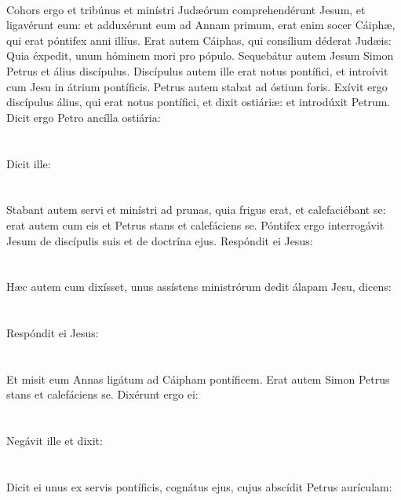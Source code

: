 \documentclass[12pt, a4paper]{article}
\begin{document}
	\\
	Cohors ergo et tribúnus et minístri Judæórum comprehendérunt Jesum, et ligavérunt eum: et adduxérunt eum ad Annam primum, erat enim socer Cáiphæ, qui erat póntifex anni illíus. Erat autem Cáiphas, qui consílium déderat Judæis: Quia éxpedit, unum hóminem mori pro pópulo. Sequebátur autem Jesum Simon Petrus et álius discípulus. Discípulus autem ille erat notus pontífici, et introívit cum Jesu in átrium pontíficis. Petrus autem stabat ad óstium foris. Exívit ergo discípulus álius, qui erat notus pontífici, et dixit ostiáriæ: et introdúxit Petrum. Dicit ergo Petro ancílla ostiária: 
	\\\\
	\\
	Dicit ille:
	\\\\
	\\
	Stabant autem servi et minístri ad prunas, quia frigus erat, et calefaciébant se: erat autem cum eis et Petrus stans et calefáciens se. Póntifex ergo interrogávit Jesum de discípulis suis et de doctrína ejus. Respóndit ei Jesus: 
	\\\\
	\\
	Hæc autem cum dixísset, unus assístens ministrórum dedit álapam Jesu, dicens:
	\\\\
	\\
	Respóndit ei Jesus:
	\\\\
	\\
	Et misit eum Annas ligátum ad Cáipham pontíficem. Erat autem Simon Petrus stans et calefáciens se. Dixérunt ergo ei:
	\\\\
	\\
	Negávit ille et dixit:
	\\\\
	\\
	Dicit ei unus ex servis pontíficis, cognátus ejus, cujus abscídit Petrus aurículam:
\end{document}
